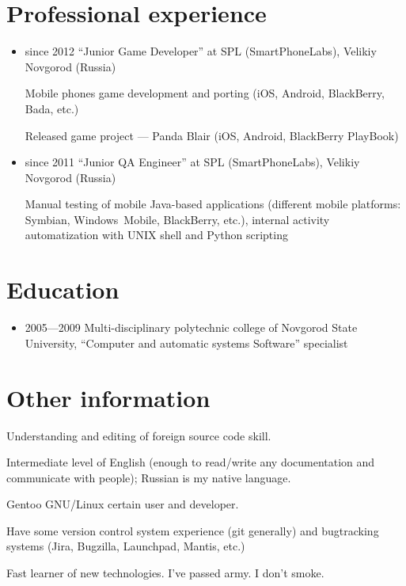 \section{Professional experience}
\begin{itemize}
\item since 2012 ``Junior Game Developer'' at SPL (SmartPhoneLabs),
Velikiy Novgorod (Russia)

Mobile phones game development and porting
(iOS, Android, BlackBerry, Bada, etc.)

Released game project --- Panda Blair (iOS, Android, BlackBerry PlayBook)

\item since 2011 ``Junior QA Engineer'' at SPL (SmartPhoneLabs),
Velikiy Novgorod (Russia)

Manual testing of mobile Java-based applications (different mobile
platforms: Symbian, Windows~Mobile, BlackBerry, etc.),
internal activity automatization with UNIX shell and Python scripting
\end{itemize}

\section{Education}
\begin{itemize}
\item 2005---2009 Multi-disciplinary polytechnic college of
Novgorod State University,
``Computer and automatic systems Software'' specialist
\end{itemize}

\section{Other information}
Understanding and editing of foreign source code skill.

Intermediate level of English
(enough to read/write any documentation and communicate with people);
Russian is my native language.

Gentoo GNU/Linux certain user and developer.

Have some version control system experience (git generally) and
bugtracking systems (Jira, Bugzilla, Launchpad, Mantis, etc.)

Fast learner of new technologies.
I've passed army.
I don't smoke.
